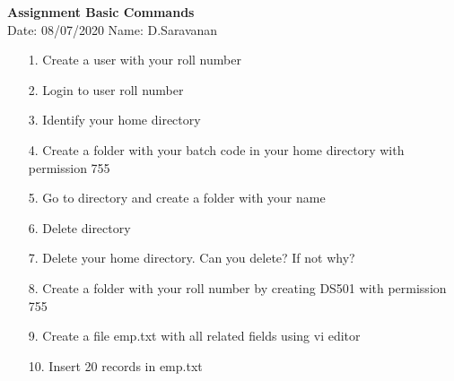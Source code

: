 \documentclass[a4paper,11pt,openright]{report}
\begin{document}
\singlespacing
\pagestyle{plain}

\begin{center}
\textbf{Assignment Basic Commands} \\
Date: 08/07/2020 \hspace{2mm} Name: D.Saravanan
\end{center}

\vspace{10px}

\begin{enumerate}

\item[1.] Create a user with your roll number
\item[2.] Login to user roll number
\item[3.] Identify your home directory
\item[4.] Create a folder with your batch code in your home directory with permission 755
\item[5.] Go to directory and create a folder with your name
\item[6.] Delete directory
\item[7.] Delete your home directory. Can you delete? If not why?
\item[8.] Create a folder with your roll number by creating DS501 with permission 755
\item[9.] Create a file emp.txt with all related fields using vi editor
\item[10.] Insert 20 records in emp.txt

\end{enumerate}
\end{document}
